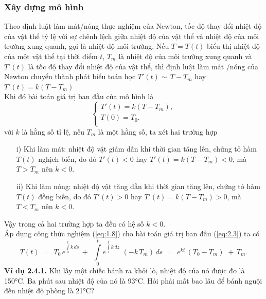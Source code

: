 \subsubsection{Xây dựng mô hình}
Theo định luật làm mát/nóng thực nghiệm của Newton, tốc độ thay đổi nhiệt độ của vật thể tỷ lệ với sự chênh lệch giữa nhiệt độ của vật thể và nhiệt độ của môi trường xung quanh, gọi là nhiệt độ môi trường. Nếu $T= T(t)$ biểu thị nhiệt độ của một vật thể tại thời điểm $t$, $T_m$ là nhiệt độ của môi trường xung quanh và ${T}'(t)$ là tốc độ thay đổi nhiệt độ của vật thể, thì định luật làm mát /nóng của Newton chuyển thành phát biểu toán học ${T}'(t)\sim \,T-{{T}_{m}}$ hay ${T}'(t)=k\left( T-{{T}_{m}} \right)$\\
Khi đó bài toán giá trị ban đầu của mô hình là 
\begin{equation}
	\left\{ \begin{array}{l}
		 {T}'(t)=k\left( T-{{T}_{m}} \right), \\ 
		 T(0)={{T}_{0}}. \\ 
	\end{array} \right.
\label{eq:2.3}
\end{equation}
với $k$ là hằng số tỉ lệ, nếu $T_m$ là một hằng số, ta xét hai trường hợp
\begin{itemize}
	\item[i)] Khi làm mát: nhiệt độ vật giảm dần khi thời gian tăng lên, chứng tỏ hàm $T(t)$ 
	nghịch biến, do đó ${T}'(t)<0 $ hay ${T}'(t)=k\left( T-{{T}_{m}} \right)<0$, mà $T>{{T}_{m}}$ nên $k<0$.
	\item[ii)] Khi làm nóng: nhiệt độ vật tăng dần khi thời gian tăng lên, chứng tỏ hàm $T(t)$ đồng biến, do đó ${T}'(t)>0$ hay ${T}'(t)=k\left( T-{{T}_{m}} \right)>0$, mà $T<{{T}_{m}}$ nên $k<0$.
\end{itemize}
Vậy trong cả hai trường hợp ta đều có hệ số $k<0.$\\
Áp dụng công thức nghiệm (\ref{eq:1.8}) cho bài toán giá trị ban đầu (\ref{eq:2.3}) ta có
\begin{equation}
	T(t)\,=\,\,\,{{T}_{0}}\,{{e}^{\int\limits_{0}^{t}{k\,ds}}}\,+\,\,\,\int\limits_{0}^{t}{{{e}^{\int\limits_{s}^{t}{k\,dz}}}}\,\,(-k\,{{T}_{m}})\,ds\,\,=\,\,{{e}^{kt}}\,({{T}_{0}}-{{T}_{m}})\,\,+\,{{T}_{m}}.
\label{eq:2.4}
\end{equation}
\textbf{Ví dụ 2.4.1.} Khi lấy một chiếc bánh ra khỏi lò, nhiệt độ của nó được đo là 150°C. Ba phút sau nhiệt độ của nó là 93°C. Hỏi phải mất bao lâu để bánh nguội đến nhiệt độ phòng là 21°C? \\
